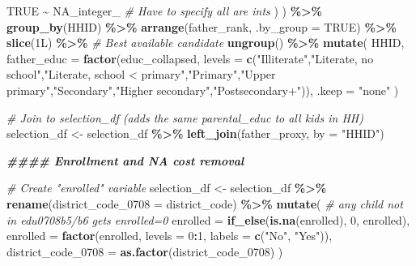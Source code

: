 \documentclass[
]{article}
\newenvironment{Shaded}{\begin{snugshade}}{\end{snugshade}}
\newcommand{\AttributeTok}[1]{\textcolor[rgb]{0.13,0.29,0.53}{#1}}
\newcommand{\CommentTok}[1]{\textcolor[rgb]{0.56,0.35,0.01}{\textit{#1}}}
\newcommand{\ConstantTok}[1]{\textcolor[rgb]{0.56,0.35,0.01}{#1}}
\newcommand{\DataTypeTok}[1]{\textcolor[rgb]{0.13,0.29,0.53}{#1}}
\newcommand{\DecValTok}[1]{\textcolor[rgb]{0.00,0.00,0.81}{#1}}
\newcommand{\DocumentationTok}[1]{\textcolor[rgb]{0.56,0.35,0.01}{\textbf{\textit{#1}}}}
\newcommand{\FunctionTok}[1]{\textcolor[rgb]{0.13,0.29,0.53}{\textbf{#1}}}
\newcommand{\NormalTok}[1]{#1}
\newcommand{\OtherTok}[1]{\textcolor[rgb]{0.56,0.35,0.01}{#1}}
\newcommand{\SpecialCharTok}[1]{\textcolor[rgb]{0.81,0.36,0.00}{\textbf{#1}}}
\newcommand{\StringTok}[1]{\textcolor[rgb]{0.31,0.60,0.02}{#1}}
\newcounter{none} %
\begin{document}
\begin{Shaded}
\begin{Highlighting}[]
      \ConstantTok{TRUE} \SpecialCharTok{\textasciitilde{}} \ConstantTok{NA\_integer\_} \CommentTok{\# Have to specify all are ints}
\NormalTok{    )}
\NormalTok{  ) }\SpecialCharTok{\%\textgreater{}\%}
  \FunctionTok{group\_by}\NormalTok{(HHID) }\SpecialCharTok{\%\textgreater{}\%}
  \FunctionTok{arrange}\NormalTok{(father\_rank, }\AttributeTok{.by\_group =} \ConstantTok{TRUE}\NormalTok{) }\SpecialCharTok{\%\textgreater{}\%}
  \FunctionTok{slice}\NormalTok{(}\DecValTok{1}\DataTypeTok{L}\NormalTok{) }\SpecialCharTok{\%\textgreater{}\%} \CommentTok{\# Best available candidate}
  \FunctionTok{ungroup}\NormalTok{() }\SpecialCharTok{\%\textgreater{}\%}
  \FunctionTok{mutate}\NormalTok{(}
\NormalTok{    HHID,}
    \AttributeTok{father\_educ =} \FunctionTok{factor}\NormalTok{(educ\_collapsed,}
                           \AttributeTok{levels =} \FunctionTok{c}\NormalTok{(}\StringTok{"Illiterate"}\NormalTok{,}\StringTok{"Literate, no school"}\NormalTok{,}\StringTok{"Literate, school \textless{} primary"}\NormalTok{,}\StringTok{"Primary"}\NormalTok{,}\StringTok{"Upper primary"}\NormalTok{,}\StringTok{"Secondary"}\NormalTok{,}\StringTok{"Higher secondary"}\NormalTok{,}\StringTok{"Postsecondary+"}\NormalTok{)),}
    \AttributeTok{.keep =} \StringTok{"none"}
\NormalTok{  )}

\CommentTok{\# Join to selection\_df (adds the same parental\_educ to all kids in HH)}
\NormalTok{selection\_df }\OtherTok{\textless{}{-}}\NormalTok{ selection\_df }\SpecialCharTok{\%\textgreater{}\%} \FunctionTok{left\_join}\NormalTok{(father\_proxy, }\AttributeTok{by =} \StringTok{"HHID"}\NormalTok{)}




\DocumentationTok{\#\#\#\# Enrollment and NA cost removal}

\CommentTok{\# Create "enrolled" variable}
\NormalTok{selection\_df }\OtherTok{\textless{}{-}}\NormalTok{ selection\_df }\SpecialCharTok{\%\textgreater{}\%}
  \FunctionTok{rename}\NormalTok{(}\AttributeTok{district\_code\_0708 =}\NormalTok{ district\_code) }\SpecialCharTok{\%\textgreater{}\%} 
  \FunctionTok{mutate}\NormalTok{(}
    \CommentTok{\# any child not in edu0708b5/b6 gets enrolled=0}
    \AttributeTok{enrolled =} \FunctionTok{if\_else}\NormalTok{(}\FunctionTok{is.na}\NormalTok{(enrolled), }\DecValTok{0}\NormalTok{, enrolled),}
    \AttributeTok{enrolled =} \FunctionTok{factor}\NormalTok{(enrolled, }\AttributeTok{levels =} \DecValTok{0}\SpecialCharTok{:}\DecValTok{1}\NormalTok{, }\AttributeTok{labels =} \FunctionTok{c}\NormalTok{(}\StringTok{"No"}\NormalTok{, }\StringTok{"Yes"}\NormalTok{)),}
    \AttributeTok{district\_code\_0708 =} \FunctionTok{as.factor}\NormalTok{(district\_code\_0708)}
\NormalTok{  )}



\end{Highlighting}
\end{Shaded}
\end{document}

